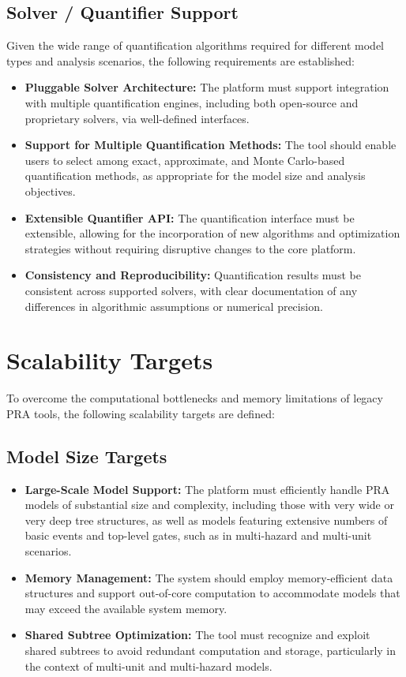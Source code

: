 \subsection{Solver / Quantifier Support}
\label{subsec:solver-support}

Given the wide range of quantification algorithms required for different model types and analysis scenarios, the following requirements are established:

\begin{itemize}
    \item \textbf{Pluggable Solver Architecture:} The platform must support integration with multiple quantification engines, including both open-source and proprietary solvers, via well-defined interfaces.
    \item \textbf{Support for Multiple Quantification Methods:} The tool should enable users to select among exact, approximate, and Monte Carlo-based quantification methods, as appropriate for the model size and analysis objectives.
    \item \textbf{Extensible Quantifier API:} The quantification interface must be extensible, allowing for the incorporation of new algorithms and optimization strategies without requiring disruptive changes to the core platform.
    \item \textbf{Consistency and Reproducibility:} Quantification results must be consistent across supported solvers, with clear documentation of any differences in algorithmic assumptions or numerical precision.
\end{itemize}

\section{Scalability Targets}
\label{sec:scalability-targets}

To overcome the computational bottlenecks and memory limitations of legacy PRA tools, the following scalability targets are defined:

\subsection{Model Size Targets}
\label{subsec:model-size-targets}

\begin{itemize}
    \item \textbf{Large-Scale Model Support:} The platform must efficiently handle PRA models of substantial size and complexity, including those with very wide or very deep tree structures, as well as models featuring extensive numbers of basic events and top-level gates, such as in multi-hazard and multi-unit scenarios.
    \item \textbf{Memory Management:} The system should employ memory-efficient data structures and support out-of-core computation to accommodate models that may exceed the available system memory.
    \item \textbf{Shared Subtree Optimization:} The tool must recognize and exploit shared subtrees to avoid redundant computation and storage, particularly in the context of multi-unit and multi-hazard models.
\end{itemize}

